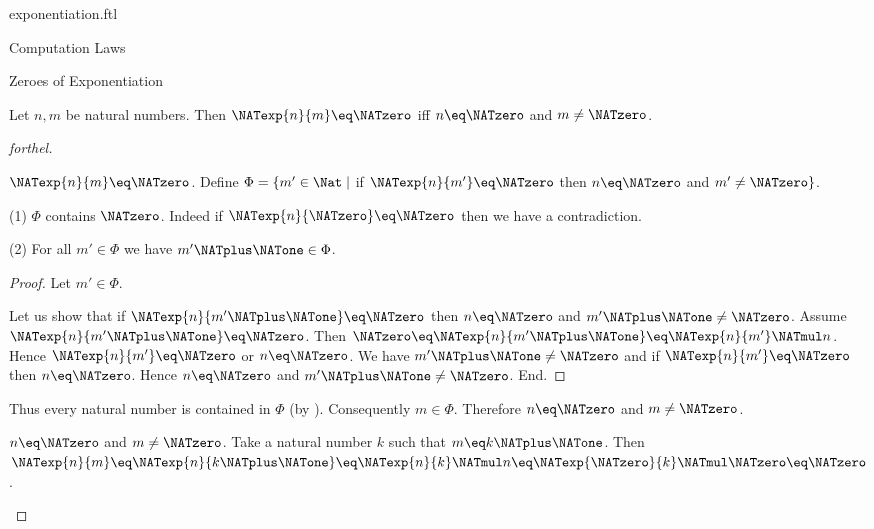 \documentclass{naproche-library}
\begin{document}
\begin{smodule}[title=Exponentiation]{exponentiation.ftl}
\begin{sfragment}{Computation Laws}
  \begin{sfragment}{Zeroes of Exponentiation}
    \begin{proposition}[forthel,id=ARITHMETIC_09_3860221447372800]
      Let $n, m$ be natural numbers.
      Then $\NATexp{n}{m} \eq \NATzero$ iff $n \eq \NATzero$ and $m \neq \NATzero$.
    \end{proposition}
    \begin{proof}[forthel]
      \begin{case}{$\NATexp{n}{m} \eq \NATzero$.}
        Define $\Phi = \{ m' \in \Nat \mid$ if $\NATexp{n}{m'} \eq \NATzero$ then $n \eq \NATzero$ and $m' \neq \NATzero \}$.

        (1) $\Phi$ contains $\NATzero$.
        Indeed if $\NATexp{n}{\NATzero} \eq \NATzero$ then we have a contradiction.

        (2) For all $m' \in \Phi$ we have $m' \NATplus \NATone \in \Phi$.
        \begin{proof}
          Let $m' \in \Phi$.

          Let us show that if $\NATexp{n}{m' \NATplus \NATone} \eq \NATzero$ then $n \eq \NATzero$ and $m' \NATplus \NATone \neq \NATzero$.
            Assume $\NATexp{n}{m' \NATplus \NATone} \eq \NATzero$.
            Then $\NATzero \eq \NATexp{n}{m' \NATplus \NATone} \eq \NATexp{n}{m'} \NATmul n$.
            Hence $\NATexp{n}{m'} \eq \NATzero$ or $n \eq \NATzero$.
            We have $m' \NATplus \NATone \neq \NATzero$ and if $\NATexp{n}{m'} \eq \NATzero$ then $n \eq \NATzero$.
            Hence $n \eq \NATzero$ and $m' \NATplus \NATone \neq \NATzero$.
          End.
        \end{proof}

        Thus every natural number is contained in $\Phi$ (by ).
        Consequently $m \in \Phi$.
        Therefore $n \eq \NATzero$ and $m \neq \NATzero$.
      \end{case}

      \begin{case}{$n \eq \NATzero$ and $m \neq \NATzero$.}
        Take a natural number $k$ such that $m \eq k \NATplus \NATone$.
        Then $\NATexp{n}{m}
          \eq \NATexp{n}{k \NATplus \NATone}
          \eq \NATexp{n}{k} \NATmul n
          \eq \NATexp{\NATzero}{k} \NATmul \NATzero
          \eq \NATzero$.
      \end{case}
    \end{proof}
  \end{sfragment}
\end{sfragment}
\end{smodule}
\end{document}
